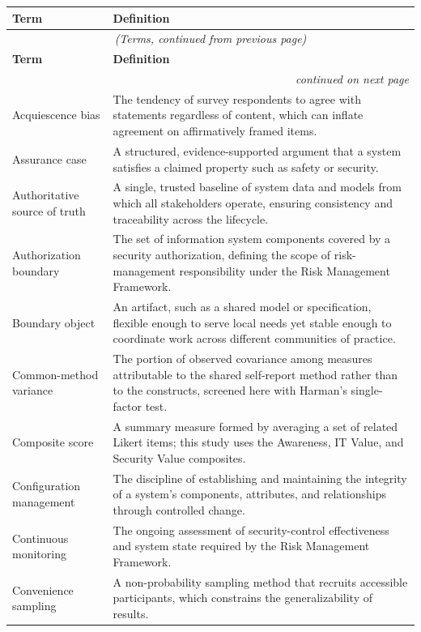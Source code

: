\begin{singlespace}
\begin{longtable}{p{} p{}}
\toprule
\textbf{Term} & \textbf{Definition} \\
\midrule
\endfirsthead
\multicolumn{2}{c}{\textit{(Terms, continued from previous page)}} \\
\toprule
\textbf{Term} & \textbf{Definition} \\
\midrule
\endhead
\midrule
\multicolumn{2}{r}{\textit{continued on next page}} \\
\endfoot
\bottomrule
\endlastfoot
Acquiescence bias & The tendency of survey respondents to agree with statements regardless of content, which can inflate agreement on affirmatively framed items. \\
Assurance case & A structured, evidence-supported argument that a system satisfies a claimed property such as safety or security. \\
Authoritative source of truth & A single, trusted baseline of system data and models from which all stakeholders operate, ensuring consistency and traceability across the lifecycle. \\
Authorization boundary & The set of information system components covered by a security authorization, defining the scope of risk-management responsibility under the Risk Management Framework. \\
Boundary object & An artifact, such as a shared model or specification, flexible enough to serve local needs yet stable enough to coordinate work across different communities of practice. \\
Common-method variance & The portion of observed covariance among measures attributable to the shared self-report method rather than to the constructs, screened here with Harman's single-factor test. \\
Composite score & A summary measure formed by averaging a set of related Likert items; this study uses the Awareness, IT Value, and Security Value composites. \\
Configuration management & The discipline of establishing and maintaining the integrity of a system's components, attributes, and relationships through controlled change. \\
Continuous monitoring & The ongoing assessment of security-control effectiveness and system state required by the Risk Management Framework. \\
Convenience sampling & A non-probability sampling method that recruits accessible participants, which constrains the generalizability of results. \\

\end{longtable}
\end{singlespace}
